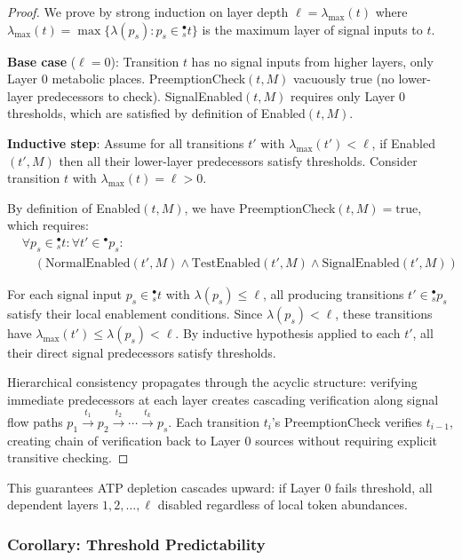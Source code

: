 \documentclass[10pt,letterpaper]{article}
\begin{document}
\begin{proof}
We prove by strong induction on layer depth $\ell = \lambda_{\max}(t)$ where $\lambda_{\max}(t) = \max\{\lambda(p_s) : p_s \in {}^\bullet_s t\}$ is the maximum layer of signal inputs to $t$.

\textbf{Base case} ($\ell = 0$): Transition $t$ has no signal inputs from higher layers, only Layer 0 metabolic places. PreemptionCheck$(t,M)$ vacuously true (no lower-layer predecessors to check). SignalEnabled$(t,M)$ requires only Layer 0 thresholds, which are satisfied by definition of Enabled$(t,M)$.

\textbf{Inductive step}: Assume for all transitions $t'$ with $\lambda_{\max}(t') < \ell$, if Enabled$(t',M)$ then all their lower-layer predecessors satisfy thresholds. Consider transition $t$ with $\lambda_{\max}(t) = \ell > 0$. 

By definition of Enabled$(t,M)$, we have PreemptionCheck$(t,M) = \text{true}$, which requires:
\begin{align*}
&\forall p_s \in {}^\bullet_s t: \forall t' \in {}^{\bullet} p_s: \\
&\quad (\text{NormalEnabled}(t',M) \wedge \text{TestEnabled}(t',M) \wedge \text{SignalEnabled}(t',M))
\end{align*}

For each signal input $p_s \in {}^\bullet_s t$ with $\lambda(p_s) \leq \ell$, all producing transitions $t' \in {}^{\bullet}_s p_s$ satisfy their local enablement conditions. Since $\lambda(p_s) < \ell$, these transitions have $\lambda_{\max}(t') \leq \lambda(p_s) < \ell$. By inductive hypothesis applied to each $t'$, all their direct signal predecessors satisfy thresholds.

Hierarchical consistency propagates through the acyclic structure: verifying immediate predecessors at each layer creates cascading verification along signal flow paths $p_1 \xrightarrow{t_1} p_2 \xrightarrow{t_2} \cdots \xrightarrow{t_k} p_s$. Each transition $t_i$'s PreemptionCheck verifies $t_{i-1}$, creating chain of verification back to Layer 0 sources without requiring explicit transitive checking.
\end{proof}

This guarantees ATP depletion cascades upward: if Layer 0 fails threshold, all dependent layers $1, 2, \ldots, \ell$ disabled regardless of local token abundances.

\subsubsection{Corollary: Threshold Predictability}
\end{document}
